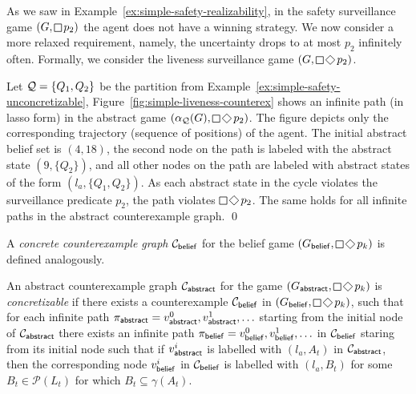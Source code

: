 \begin{example}\label{ex:simple-liveness-counterex}
As we saw in Example~\ref{ex:simple-safety-realizability}, in the safety surveillance game $(G,\LTLglobally p_2)$ the agent does not have a winning strategy. %
We now consider a more relaxed requirement, namely, the uncertainty drops to at most $p_2$ infinitely often. Formally, we consider the liveness surveillance game 
$(G,\LTLglobally \LTLfinally p_2)$.

Let $\mathcal{Q} = \{Q_1,Q_2\}$ be the partition from Example~\ref{ex:simple-safety-unconcretizable},  %
Figure~\ref{fig:simple-liveness-counterex} shows an infinite path (in lasso form) in the abstract game $(\alpha_\part(G),\LTLglobally \LTLfinally p_2)$.  The figure depicts only the corresponding trajectory (sequence of positions) of the agent. The initial abstract belief set is $(4,18)$, the second node on the path is labeled with the abstract state $(9,\{Q_2\})$, and all other nodes on the path are labeled with abstract states of the form $(l_a,\{Q_1,Q_2\})$. As each abstract state in the cycle violates the surveillance predicate $p_2$, the path violates $\LTLglobally \LTLfinally p_2$. The same holds for all infinite paths in the abstract counterexample graph.
\qed
\end{example}

A \emph{concrete counterexample graph} $\mathcal{C}_{\mathsf{belief}}$ for the belief game $(G_\belief,\LTLglobally\LTLfinally p_k)$ is defined analogously. 

An abstract counterexample graph $\mathcal{C}_{\mathsf{abstract}}$ for the game $(G_\abstr,\LTLglobally\LTLfinally p_k)$ is \emph{concretizable} if there exists a counterexample
$\mathcal{C}_{\mathsf{belief}}$ in $(G_\belief,\LTLglobally \LTLfinally p_k)$, such that for each infinite path $\pi_{\mathsf{abstract}} = v_{\mathsf{abstract}}^0,v_{\mathsf{abstract}}^1,\ldots$ starting from the initial node of $\mathcal{C}_{\mathsf{abstract}}$ there exists an infinite path $\pi_{\mathsf{belief}} = v_{\mathsf{belief}}^0,v_{\mathsf{belief}}^1,\ldots$ in $\mathcal{C}_{\mathsf{belief}}$ staring from its initial node such that if $v_{\mathsf{abstract}}^i$ is labelled with $(l_a,A_t)$ in $\mathcal{C}_{\mathsf{abstract}}$, then the corresponding node $v_{\mathsf{belief}}^i$ in $\mathcal{C}_{\mathsf{belief}}$ is labelled with $(l_a,B_t)$ for some $B_t \in \mathcal{P}(L_t)$ for which $B_t \subseteq \gamma(A_t)$.

